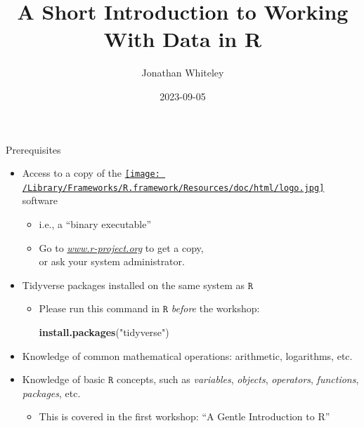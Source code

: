 \documentclass[
  11pt,
  ignorenonframetext,
]{beamer}
\title{A Short Introduction to Working With Data in R}
\author{Jonathan Whiteley}
\date{2023-09-05}
\newenvironment{Shaded}{\begin{snugshade}}{\end{snugshade}}
\newcommand{\FunctionTok}[1]{\textcolor[rgb]{0.13,0.29,0.53}{\textbf{#1}}}
\newcommand{\NormalTok}[1]{#1}
\newcommand{\StringTok}[1]{\textcolor[rgb]{0.31,0.60,0.02}{#1}}
\providecommand{\tightlist}{%
  \setlength{\itemsep}{0pt}\setlength{\parskip}{0pt}}
\newcommand{\R}{\texttt{R}}
\begin{document}
\frame{\titlepage}

\begin{frame}[fragile]{Prerequisites}
\protect\hypertarget{prerequisites}{}
\begin{itemize}
\item
  Access to a copy of the
  \href{https://www.r-project.org}{\texttt{[image: /Library/Frameworks/R.framework/Resources/doc/html/logo.jpg]}}
  software

  \begin{itemize}
  \item
    i.e., a ``binary executable''
  \item
    Go to \href{https://www.r-project.org}{\emph{www.r-project.org}} to
    get a copy,\\
    or ask your system administrator.
  \end{itemize}
\item
  Tidyverse packages installed on the same system as \(\R\)

  \begin{itemize}
  \item
    Please run this command in \(\R\) \emph{before} the workshop:

\begin{Shaded}
\begin{Highlighting}[]
\FunctionTok{install.packages}\NormalTok{(}\StringTok{"tidyverse"}\NormalTok{)}
\end{Highlighting}
\end{Shaded}
  \end{itemize}
\item
  Knowledge of common mathematical operations: arithmetic, logarithms,
  etc.
\item
  Knowledge of basic \(\R\) concepts, such as \emph{variables},
  \emph{objects}, \emph{operators}, \emph{functions}, \emph{packages},
  etc.

  \begin{itemize}
  \tightlist
  \item
    This is covered in the first workshop: ``A Gentle Introduction to
    R''
  \end{itemize}
\end{itemize}
\end{frame}
\end{document}
